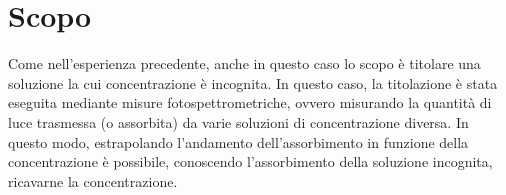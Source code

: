 \section*{Scopo}

Come nell'esperienza precedente, anche in questo caso lo scopo è titolare una
soluzione la cui concentrazione è incognita. In questo caso, la titolazione è stata
eseguita mediante misure fotospettrometriche, ovvero misurando la quantità di
luce trasmessa (o assorbita) da varie soluzioni di concentrazione diversa.
In questo modo, estrapolando l'andamento dell'assorbimento in funzione della
concentrazione è possibile, conoscendo l'assorbimento della soluzione incognita,
ricavarne la concentrazione.
